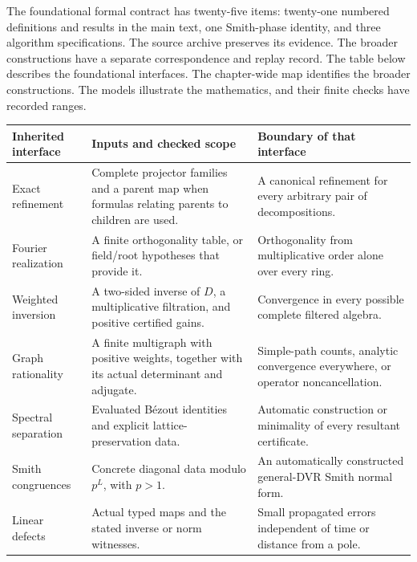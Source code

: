 
The foundational formal contract has twenty-five items: twenty-one numbered definitions and results in the main text, one Smith-phase identity, and three algorithm specifications. The source archive preserves its evidence. The broader constructions have a separate correspondence and replay record. The table below describes the foundational interfaces. The chapter-wide map identifies the broader constructions. The models illustrate the mathematics, and their finite checks have recorded ranges.



{\small
\begin{tabularx}{\linewidth}{@{}p{.28\linewidth}YY@{}}\toprule
\textbf{Inherited interface} & \textbf{Inputs and checked scope} & \textbf{Boundary of that interface}\\\midrule
Exact refinement & Complete projector families and a parent map when formulas relating parents to children are used. & A canonical refinement for every arbitrary pair of decompositions.\\
Fourier realization & A finite orthogonality table, or field/root hypotheses that provide it. & Orthogonality from multiplicative order alone over every ring.\\
Weighted inversion & A two-sided inverse of $D$, a multiplicative filtration, and positive certified gains. & Convergence in every possible complete filtered algebra.\\
Graph rationality & A finite multigraph with positive weights, together with its actual determinant and adjugate. & Simple-path counts, analytic convergence everywhere, or operator noncancellation.\\
Spectral separation & Evaluated B\'ezout identities and explicit lattice-preservation data. & Automatic construction or minimality of every resultant certificate.\\
Smith congruences & Concrete diagonal data modulo $p^L$, with $p>1$. & An automatically constructed general-DVR Smith normal form.\\
Linear defects & Actual typed maps and the stated inverse or norm witnesses. & Small propagated errors independent of time or distance from a pole.\\\bottomrule
\end{tabularx}}

